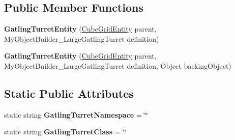 \subsection*{Public Member Functions}
\begin{DoxyCompactItemize}
\item 
\hypertarget{class_s_e_mod_a_p_i_internal_1_1_a_p_i_1_1_entity_1_1_sector_1_1_sector_object_1_1_cube_grid_1_199af756543e7cb8f4eabd4b9d47d9c9e_a7186782002f14177d75f7ef0e7497bff}{}{\bfseries Gatling\+Turret\+Entity} (\hyperlink{class_s_e_mod_a_p_i_internal_1_1_a_p_i_1_1_entity_1_1_sector_1_1_sector_object_1_1_cube_grid_entity}{Cube\+Grid\+Entity} parent, My\+Object\+Builder\+\_\+\+Large\+Gatling\+Turret definition)\label{class_s_e_mod_a_p_i_internal_1_1_a_p_i_1_1_entity_1_1_sector_1_1_sector_object_1_1_cube_grid_1_199af756543e7cb8f4eabd4b9d47d9c9e_a7186782002f14177d75f7ef0e7497bff}

\item 
\hypertarget{class_s_e_mod_a_p_i_internal_1_1_a_p_i_1_1_entity_1_1_sector_1_1_sector_object_1_1_cube_grid_1_199af756543e7cb8f4eabd4b9d47d9c9e_adb6e95dda3cdae8189a2ea6f89bff514}{}{\bfseries Gatling\+Turret\+Entity} (\hyperlink{class_s_e_mod_a_p_i_internal_1_1_a_p_i_1_1_entity_1_1_sector_1_1_sector_object_1_1_cube_grid_entity}{Cube\+Grid\+Entity} parent, My\+Object\+Builder\+\_\+\+Large\+Gatling\+Turret definition, Object backing\+Object)\label{class_s_e_mod_a_p_i_internal_1_1_a_p_i_1_1_entity_1_1_sector_1_1_sector_object_1_1_cube_grid_1_199af756543e7cb8f4eabd4b9d47d9c9e_adb6e95dda3cdae8189a2ea6f89bff514}

\end{DoxyCompactItemize}
\subsection*{Static Public Attributes}
\begin{DoxyCompactItemize}
\item 
\hypertarget{class_s_e_mod_a_p_i_internal_1_1_a_p_i_1_1_entity_1_1_sector_1_1_sector_object_1_1_cube_grid_1_199af756543e7cb8f4eabd4b9d47d9c9e_ae9a56c141f1156881bc1a8c9826912c1}{}static string {\bfseries Gatling\+Turret\+Namespace} = \char`\"{}\char`\"{}\label{class_s_e_mod_a_p_i_internal_1_1_a_p_i_1_1_entity_1_1_sector_1_1_sector_object_1_1_cube_grid_1_199af756543e7cb8f4eabd4b9d47d9c9e_ae9a56c141f1156881bc1a8c9826912c1}

\item 
\hypertarget{class_s_e_mod_a_p_i_internal_1_1_a_p_i_1_1_entity_1_1_sector_1_1_sector_object_1_1_cube_grid_1_199af756543e7cb8f4eabd4b9d47d9c9e_ac85da084c6c2e809366f2615ba7e1dff}{}static string {\bfseries Gatling\+Turret\+Class} = \char`\"{}\char`\"{}\label{class_s_e_mod_a_p_i_internal_1_1_a_p_i_1_1_entity_1_1_sector_1_1_sector_object_1_1_cube_grid_1_199af756543e7cb8f4eabd4b9d47d9c9e_ac85da084c6c2e809366f2615ba7e1dff}

\end{DoxyCompactItemize}
